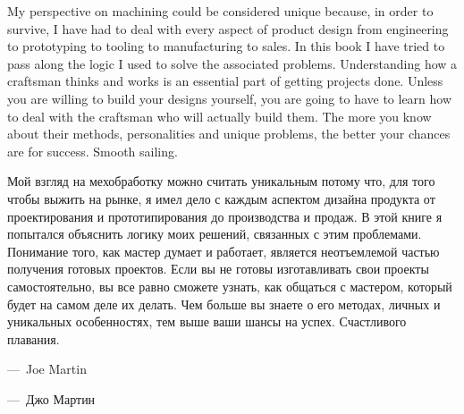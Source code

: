 
\begin{enen}
My perspective on machining could be considered unique because, in order to
survive, I have had to deal with every aspect of product design from engineering
to prototyping to tooling to manufacturing to sales. In this book I have tried
to pass along the logic I used to solve the associated problems. Understanding
how a craftsman thinks and works is an essential part of getting projects done.
Unless you are willing to build your designs yourself, you are going to have to
learn how to deal with the craftsman who will actually build them. The more you
know about their methods, personalities and unique problems, the better your
chances are for success. Smooth sailing.
\end{enen}

\begin{ruru}
Мой взгляд на мехобработку можно считать уникальным потому что, для того чтобы
выжить на рынке, я имел дело с каждым аспектом дизайна продукта от
проектирования и прототипирования до производства и продаж. В этой книге я
попытался объяснить логику моих решений, связанных с этим проблемами. Понимание
того, как мастер думает и работает, является неотъемлемой частью получения
готовых проектов. Если вы не готовы изготавливать свои проекты самостоятельно,
вы все равно сможете узнать, как общаться с мастером, который будет на самом
деле их делать. Чем больше вы знаете о его методах, личных и уникальных
особенностях, тем выше ваши шансы на успех. Счастливого плавания.
\end{ruru}

\bigskip
\begin{enen}
---\ Joe Martin
\end{enen}

\begin{ruru}
---\ Джо Мартин
\end{ruru}

\secup
\secup
